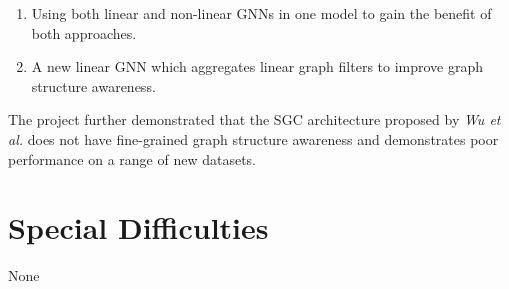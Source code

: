 \documentclass[12pt,a4paper,openany,openright]{report}
\begin{document}
\begin{enumerate}[nolistsep]
    \item Using both linear and non-linear GNNs in one model to gain the benefit of both approaches.
    \item A new linear GNN which aggregates linear graph filters to improve graph structure awareness.
\end{enumerate}
The project further demonstrated that the SGC architecture proposed by \textit{Wu et al.} does not have fine-grained graph structure awareness and demonstrates poor performance on a range of new datasets.

\section*{Special Difficulties}

None


\pagestyle{headings}

\tableofcontents









\appendix







\end{document}
